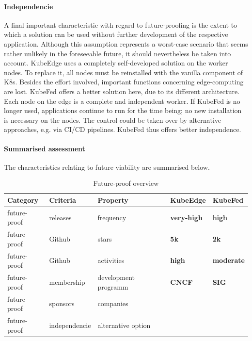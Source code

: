 \documentclass[MSC,Master,english]{twbook}%
\newcommand{\cmark}{\ding{51}}%
\newcommand{\xmark}{\ding{55}}%
\begin{document}
\paragraph{Independencie} A final important characteristic with regard to future-proofing is the extent to which a solution can be used without further development of the respective application. Although this assumption represents a worst-case scenario that seems rather unlikely in the foreseeable future, it should nevertheless be taken into account. KubeEdge uses a completely self-developed solution on the worker nodes. To replace it, all nodes must be reinstalled with the vanilla component of \ac{K8s}. Besides the effort involved, important functions concerning edge-computing are lost. \ac{KubeFed} offers a better solution here, due to its different architecture. Each node on the edge is a complete and independent worker. If KubeFed is no longer used, applications continue to run for the time being; no new installation is necessary on the nodes. The control could be taken over by alternative approaches, e.g. via \ac{CI/CD} pipelines. KubeFed thus offers better independence.

\paragraph{Summarised assessment} The characteristics relating to future viability are summarised below.  
\begin{table}[ht]
    \begin{center}
        \begin{tabular}{|l|l|l|l|l|}
            \hline
            Category & Criteria & Property & \textbf{KubeEdge} & \textbf{KubeFed} \\
            \hline
            future-proof & releases & frequency & \textbf{very-high} & \textbf{high} \\
            future-proof & Github & stars & \textbf{5k} & \textbf{2k} \\
            future-proof & Github & activities & \textbf{high} & \textbf{moderate} \\
            future-proof & membership & development programm & \textbf{CNCF} & \textbf{SIG} \\
            future-proof & sponsors & companies & \cmark & \xmark \\
            future-proof & independencie & alternative option & \xmark & \cmark \\
            \hline
        \end{tabular}
        \caption{Future-proof overview}
        \label{tab:fp-overview}
    \end{center}
\end{table}
\end{document}
